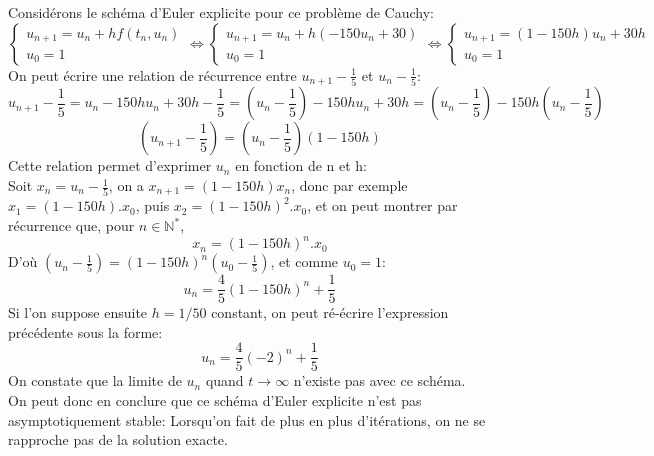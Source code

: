 \documentclass[a4paper,12pt,landscape]{article}
\begin{document}
\subsection{}
Considérons le schéma d'Euler explicite pour ce problème de Cauchy:
$$\left \{
\begin{array}{l}
	u_{n+1}= u_{n} + h f(t_n , u_n)\\
	u_0 = 1
\end{array}
\right.
\Leftrightarrow
\left \{
\begin{array}{l}
	u_{n+1}= u_{n} + h(-150 u_n + 30)\\
	u_0 = 1
\end{array}
\right.
\Leftrightarrow
\left \{
\begin{array}{l}
	u_{n+1}= (1-150h)u_{n} + 30h\\
	u_0 = 1
\end{array}
\right.$$
On peut écrire une relation de récurrence entre $u_{n+1}-\frac{1}{5}$ et $u_{n}-\frac{1}{5}$:
$$u_{n+1}-\frac{1}{5}= u_n - 150hu_n+30h-\frac{1}{5}= (u_n-\frac{1}{5})-150hu_n + 30h = (u_n-\frac{1}{5})-150h(u_n-\frac{1}{5})$$
$$(u_{n+1}-\frac{1}{5})= (u_n-\frac{1}{5})(1-150h)$$
Cette relation permet d'exprimer $u_n$ en fonction de n et h:\\
Soit $x_n=u_{n}-\frac{1}{5}$, on a $x_{n+1}=(1-150h)x_n$, donc par exemple $x_1=(1-150h).x_0$, puis $x_2=(1-150h)^2.x_0$, et on peut montrer par récurrence que, pour $n \in \mathbb{N}^*$,
$$x_n=(1-150h)^n.x_0$$
D'où $(u_n-\frac{1}{5})=(1-150h)^n(u_0-\frac{1}{5})$, et comme $u_0=1$:
$$u_n=\frac{4}{5}(1-150h)^n+\frac{1}{5}$$
Si l'on suppose ensuite $h=1/50$ constant, on peut ré-écrire l'expression précédente sous la forme: $$u_n=\frac{4}{5}(-2)^n+\frac{1}{5}$$ On constate que la limite de $u_n$ quand $t \rightarrow \infty$ n'existe pas avec ce schéma.\\
On peut donc en conclure que ce schéma d'Euler explicite n'est pas  asymptotiquement stable: Lorsqu'on fait de plus en plus d'itérations, on ne se rapproche pas de la solution exacte.
\end{document}
